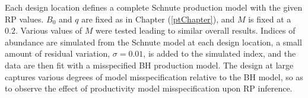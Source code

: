Each design location defines a complete Schnute production model with the given
RP values. $B_0$ and $q$ are fixed as in Chapter (\ref{ptChapter}), and $M$ 
is fixed at a $0.2$. Various values of $M$ were tested leading to similar overall results. 
Indices of abundance are simulated from the Schnute model at each design 
location, a small amount of residual variation, $\sigma=0.01$, is added to the 
simulated index, and the data are then fit with a misspecified BH production 
model. The design at large captures various degrees of model misspecification 
relative to the BH model, so as to observe the effect of productivity model 
misspecification upon RP inference.
%
%
%
%

